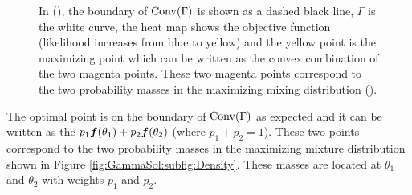 \begin{figure}[ht]
\begin{minipage}{0.5\textwidth}
			\end{minipage}
			\caption{In (), the boundary of $\mathrm{Conv}(\Gamma)$ is shown as a dashed black line, $\Gamma$ is the white curve, the heat map  shows the objective function (likelihood increases from blue to yellow) and the yellow point is the maximizing point which can be written as the convex combination of the two magenta points. These two magenta points correspond to the two probability masses in the maximizing mixing distribution ().}
			\label{fig:GammaSol}
		\end{figure}
		The optimal point is on the boundary of $\mathrm{Conv}(\Gamma)$ as expected and it can be written as the  $p_1 {\bm{{f}}}(\theta_1) + p_2 {\bm{{f}}}(\theta_2)$ (where $p_1 + p_2 =1 $). These two points correspond to the two probability masses in the maximizing mixture distribution shown in Figure \ref{fig:GammaSol:subfig:Density}. These masses are located at $\theta_1$ and $\theta_2$ with weights $p_1$ and $p_2$.

